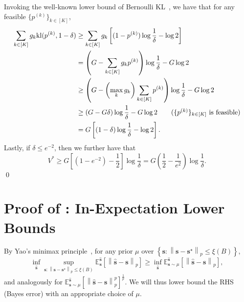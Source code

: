 \documentclass{article}
\def\vs{{\bm{s}}}
\newcommand{\E}{\mathbb{E}}
\newcommand{\kl}{\mathrm{kl}}
\theoremstyle{plain}
\theoremstyle{definition}
\theoremstyle{plain}
\newcommand{\bignorm}[1]{\left\lVert #1 \right\rVert}
\begin{document}
Invoking the well-known lower bound of Bernoulli KL~\citep[Eqn. (11)]{garivier2019lower}, we have that for any feasible $\{p^{(k)}\}_{k \in [K]}$,
\begin{align}
    \sum_{k \in [K]} g_k \kl(p^{(k)}, 1 - \delta) &\geq \sum_{k \in [K]} g_k \left[ (1-p^{(k)}) \log\frac{1}{\delta} - \log 2 \right] \nonumber \\
    &= \left( G - \sum_{k \in [K]} g_k p^{(k)} \right) \log\frac{1}{\delta} - G \log 2 \\
    &\geq \left( G - \left( \max_k g_k \right) \sum_{k \in [K]} p^{(k)} \right) \log\frac{1}{\delta} - G \log 2 \\
    &\geq \left( G - G \delta \right) \log\frac{1}{\delta} - G \log 2 \tag{$\{p^{(k)}\}_{k \in [K]}$ is feasible} \\
    &= G\left[ (1 - \delta)\log\frac{1}{\delta} - \log 2 \right].
\end{align}
Lastly, if $\delta \leq e^{-2}$, then we further have that
\begin{equation}
    V^* \geq G \left[ (1 - e^{-2}) - \frac{1}{2} \right] \log\frac{1}{\delta}
    = G \left( \frac{1}{2} - \frac{1}{e^2} \right) \log\frac{1}{\delta}.
\end{equation}
\qed






\newpage
\section{\texorpdfstring{Proof of : In-Expectation Lower Bounds}{Proof of Theorem 5.2: In-Expectation Lower Bounds}}
\label{app:lower-bound-exp}

By Yao's minimax principle~\citep{yao1977}, for any prior $\mu$ over $\left\{ \vs : \bignorm{\vs - \vs^\star}_p \leq \xi(B) \right\}$,
\begin{equation}
    \inf_{\hat{\vs}} \sup_{\vs : \bignorm{\vs - \vs^\star}_p \leq \xi(B)} \E^{\hat{\vs}}_{\vs}\left[ \bignorm{\hat{\vs} - \vs}_p \right] \geq \inf_{\hat{\vs}} \E^{\hat{\vs}}_{\vs \sim \mu}\left[ \bignorm{\hat{\vs} - \vs}_p \right],
\end{equation}
and analogously for $\E^{\hat{\vs}}_{\vs \sim \mu}\left[ \bignorm{\hat{\vs} - \vs}_p^p \right]^{\frac{1}{p}}$.
We will thus lower bound the RHS (Bayes error) with an appropriate choice of $\mu$.
\end{document}
